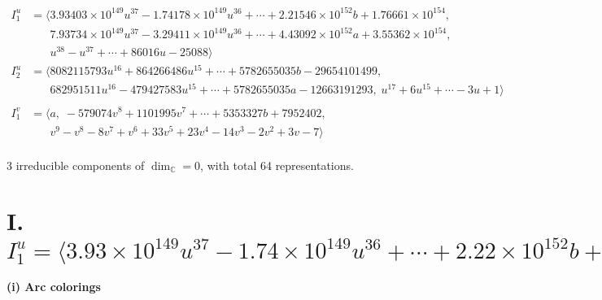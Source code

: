\documentclass[1p]{elsarticle_modified}
\theoremstyle{definition}
\begin{document}
\begin{align*}
I^u_{1}&=\langle 
3.93403\times10^{149} u^{37}-1.74178\times10^{149} u^{36}+\cdots+2.21546\times10^{152} b+1.76661\times10^{154},\\
\phantom{I^u_{1}}&\phantom{= \langle  }7.93734\times10^{149} u^{37}-3.29411\times10^{149} u^{36}+\cdots+4.43092\times10^{152} a+3.55362\times10^{154},\\
\phantom{I^u_{1}}&\phantom{= \langle  }u^{38}- u^{37}+\cdots+86016 u-25088\rangle \\
I^u_{2}&=\langle 
8082115793 u^{16}+864266486 u^{15}+\cdots+5782655035 b-29654101499,\\
\phantom{I^u_{2}}&\phantom{= \langle  }682951511 u^{16}-479427583 u^{15}+\cdots+5782655035 a-12663191293,\;u^{17}+6 u^{15}+\cdots-3 u+1\rangle \\
\\
I^v_{1}&=\langle 
a,\;-579074 v^8+1101995 v^7+\cdots+5353327 b+7952402,\\
\phantom{I^v_{1}}&\phantom{= \langle  }v^9- v^8-8 v^7+v^6+33 v^5+23 v^4-14 v^3-2 v^2+3 v-7\rangle \\
\end{align*}
\raggedright * 3 irreducible components of $\dim_{\mathbb{C}}=0$, with total 64 representations.\\
\newpage
\renewcommand{\arraystretch}{1}
\centering \section*{I. $I^u_{1}= \langle 3.93\times10^{149} u^{37}-1.74\times10^{149} u^{36}+\cdots+2.22\times10^{152} b+1.77\times10^{154},\;7.94\times10^{149} u^{37}-3.29\times10^{149} u^{36}+\cdots+4.43\times10^{152} a+3.55\times10^{154},\;u^{38}- u^{37}+\cdots+86016 u-25088 \rangle$}
\flushleft \textbf{(i) Arc colorings}\\
\end{document}
